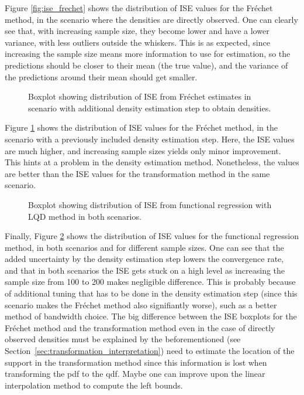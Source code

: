 Figure \ref{fig:ise_frechet} shows the distribution of ISE values for the Fréchet method,
in the scenario where the densities are directly observed. One can clearly see that, with
increasing sample size, they become lower and have a lower variance, with less outliers
outside the whiskers. This is as expected, since increasing the sample size
means more information to use for estimation, so the predictions should be closer to
their mean (the true value), and the variance of the predictions around their mean should
get smaller.

\begin{figure}[h]
    \centering
    \resizebox{1\textwidth}{!}{}
    \caption[Simulation results: ISE boxplot --- Fréchet method with estimated densities]{Boxplot
    showing distribution of ISE from Fréchet estimates in scenario with additional
    density estimation step to obtain densities.}
    \label{fig:ise_frechet_denstimation}
\end{figure}

Figure \ref{fig:ise_frechet_denstimation} shows the distribution of ISE values for
the Fréchet method, in the scenario with a previously included density estimation step.
Here, the ISE values are much higher, and increasing sample sizes yields only minor
improvement. This hints at a problem in the density estimation method. Nonetheless,
the values are better than the ISE values for the transformation method in the same
scenario.

\begin{figure}[h]
    \centering
    \resizebox{\textwidth}{!}{}
    \caption[Simulation results: ISE boxplot --- functional regression]{Boxplot showing
    distribution of ISE from functional regression with LQD method in both scenarios.}
    \label{fig:ise_func_reg_both}
\end{figure}

Finally, Figure \ref{fig:ise_func_reg_both} shows the distribution of ISE values for
the functional regression method, in both scenarios and for different sample sizes. One
can see that the added uncertainty by the density estimation step lowers the convergence
rate, and that in both scenarios the ISE gets stuck on a high level as increasing the
sample size from 100 to 200 makes negligible difference. This is probably
because of additional tuning that has to be done in the density estimation step (since
this scenario makes the Fréchet method also signifiantly worse), such as a better method
of bandwidth choice. The big difference between the ISE boxplots for the Fréchet method and
the transformation method even in the case of directly observed densities must be explained
by the beforementioned (see Section~\ref{sec:transformation_interpretation}) need to
estimate the location of the support in the transformation method since this information
is lost when transforming the pdf to the qdf. Maybe one can improve upon the linear
interpolation method to compute the left bounds.
